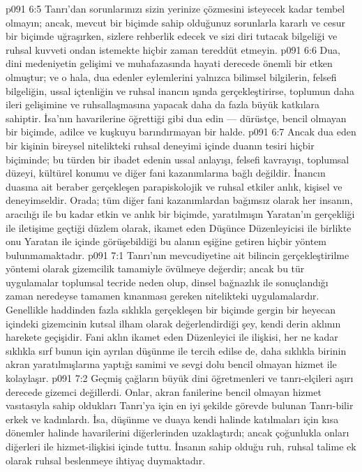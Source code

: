 \vs p091 6:5 Tanrı’dan sorunlarınızı sizin yerinize çözmesini isteyecek kadar tembel olmayın; ancak, mevcut bir biçimde sahip olduğunuz sorunlarla kararlı ve cesur bir biçimde uğraşırken, sizlere rehberlik edecek ve sizi diri tutacak bilgeliği ve ruhsal kuvveti ondan istemekte hiçbir zaman tereddüt etmeyin.
\vs p091 6:6 Dua, dini medeniyetin gelişimi ve muhafazasında hayati derecede önemli bir etken olmuştur; ve o hala, dua edenler eylemlerini yalnızca bilimsel bilgilerin, felsefi bilgeliğin, ussal içtenliğin ve ruhsal inancın ışında gerçekleştirirse, toplumun daha ileri gelişimine ve ruhsallaşmasına yapacak daha da fazla büyük katkılara sahiptir. İsa’nın havarilerine öğrettiği gibi dua edin --- dürüstçe, bencil olmayan bir biçimde, adilce ve kuşkuyu barındırmayan bir halde.
\vs p091 6:7 Ancak dua eden bir kişinin bireysel nitelikteki ruhsal deneyimi içinde duanın tesiri hiçbir biçiminde; bu türden bir ibadet edenin ussal anlayışı, felsefi kavrayışı, toplumsal düzeyi, kültürel konumu ve diğer fani kazanımlarına bağlı değildir. İnancın duasına ait beraber gerçekleşen parapiskolojik ve ruhsal etkiler anlık, kişisel ve deneyimseldir. Orada; tüm diğer fani kazanımlardan bağımsız olarak her insanın, aracılığı ile bu kadar etkin ve anlık bir biçimde, yaratılmışın Yaratan’ın gerçekliği ile iletişime geçtiği düzlem olarak, ikamet eden Düşünce Düzenleyicisi ile birlikte onu Yaratan ile içinde görüşebildiği bu alanın eşiğine getiren hiçbir yöntem bulunmamaktadır.
\vs p091 7:1 Tanrı’nın mevcudiyetine ait bilincin gerçekleştirilme yöntemi olarak gizemcilik tamamiyle övülmeye değerdir; ancak bu tür uygulamalar toplumsal tecride neden olup, dinsel bağnazlık ile sonuçlandığı zaman neredeyse tamamen kınanması gereken nitelikteki uygulamalardır. Genellikle haddinden fazla sıklıkla gerçekleşen bir biçimde gergin bir heyecan içindeki gizemcinin kutsal ilham olarak değerlendirdiği şey, kendi derin aklının harekete geçişidir. Fani aklın ikamet eden Düzenleyici ile ilişkisi, her ne kadar sıklıkla sırf bunun için ayrılan düşünme ile tercih edilse de, daha sıklıkla birinin akran yaratılmışlarına yaptığı samimi ve sevgi dolu bencil olmayan hizmet ile kolaylaşır.
\vs p091 7:2 Geçmiş çağların büyük dini öğretmenleri ve tanrı\hyp{}elçileri aşırı derecede gizemci değillerdi. Onlar, akran fanilerine bencil olmayan hizmet vasıtasıyla sahip oldukları Tanrı’ya için en iyi şekilde görevde bulunan Tanrı\hyp{}bilir erkek ve kadınlardı. İsa, düşünme ve duaya kendi halinde katılmaları için kısa dönemler halinde havarilerini diğerlerinden uzaklaştırdı; ancak çoğunlukla onları diğerleri ile hizmet\hyp{}ilişkisi içinde tuttu. İnsanın sahip olduğu ruh, ruhsal talime ek olarak ruhsal beslenmeye ihtiyaç duymaktadır.
